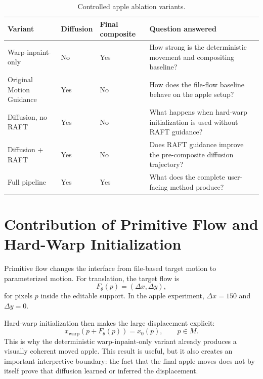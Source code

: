 \begin{table}[p]
  \centering
  \caption{Controlled apple ablation variants.}
  \label{tab:ablation-components}
  \small
  \renewcommand{\arraystretch}{1.12}
  \begin{tabular}{p{1.25in}|p{1.15in}|p{1.2in}|p{1.8in}}
    \hline
    \textbf{Variant} & \textbf{Diffusion} & \textbf{Final composite} & \textbf{Question answered} \\ \hline \hline
    Warp-inpaint-only & No & Yes & How strong is the deterministic movement and compositing baseline? \\ \hline
    Original Motion Guidance & Yes & No & How does the file-flow baseline behave on the apple setup? \\ \hline
    Diffusion, no RAFT & Yes & No & What happens when hard-warp initialization is used without RAFT guidance? \\ \hline
    Diffusion + RAFT & Yes & No & Does RAFT guidance improve the pre-composite diffusion trajectory? \\ \hline
    Full pipeline & Yes & Yes & What does the complete user-facing method produce? \\ \hline
  \end{tabular}
\end{table}

\section{Contribution of Primitive Flow and Hard-Warp Initialization}

Primitive flow changes the interface from file-based target motion to parameterized motion. For translation, the target flow is
\begin{equation}
  F_\theta(p) = (\Delta x, \Delta y),
\end{equation}
for pixels $p$ inside the editable support. In the apple experiment, $\Delta x=150$ and $\Delta y=0$.

Hard-warp initialization then makes the large displacement explicit:
\begin{equation}
  x_{\mathrm{warp}}(p + F_\theta(p)) = x_0(p),
  \qquad p \in M.
\end{equation}
This is why the deterministic warp-inpaint-only variant already produces a visually coherent moved apple. This result is useful, but it also creates an important interpretive boundary: the fact that the final apple moves does not by itself prove that diffusion learned or inferred the displacement.

